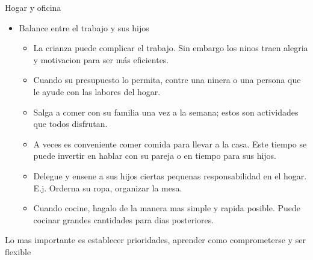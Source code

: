\documentclass[
10pt,
aspectratio=169,
]{beamer}
\begin{document}
\begin{frame}[c]{Hogar y oficina}
\begin{itemize}
\item \alert{Balance entre el trabajo y sus hijos}
\begin{itemize}
\item La crianza puede complicar el trabajo. Sin embargo los ninos traen alegria y motivacion para ser m\'as eficientes.
\item Cuando su presupuesto lo permita, contre una ninera o una persona que le ayude con las labores del hogar. 
\item Salga a comer con su familia una vez a la semana; estos son actividades que todos disfrutan.
\item A veces es conveniente comer comida para llevar a la casa. Este tiempo se puede invertir en hablar con su pareja o en tiempo para sus hijos.
\item Delegue y ensene a sus hijos ciertas pequenas responsabilidad en el hogar. E.j. Orderna su ropa, organizar la mesa.
\item Cuando cocine, hagalo de la manera mas simple y rapida posible. Puede cocinar grandes cantidades para dias posteriores. 
\end{itemize}
\end{itemize}
Lo mas importante es establecer prioridades, aprender como comprometerse y ser flexible
\end{frame}
\end{document}
